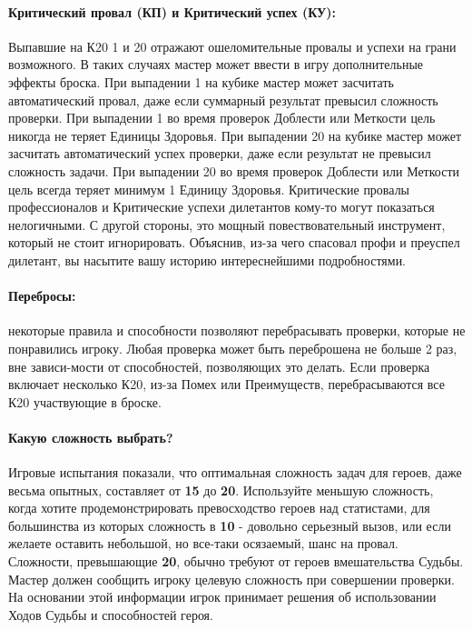 \paragraph{Критический провал (КП) и Критический успех (КУ):} 
Выпавшие на К20 1 и 20 отражают ошеломительные провалы и успехи на грани возможного. В таких случаях мастер может ввести в игру дополнительные эффекты броска. 
\newline При выпадении 1 на кубике мастер может засчитать автоматический провал, даже если суммарный результат превысил сложность проверки. При выпадении 1 во время проверок Доблести или Меткости цель никогда не теряет Единицы Здоровья.
\newline При выпадении 20 на кубике мастер может засчитать автоматический успех проверки, даже если результат не превысил сложность задачи. При выпадении 20 во время проверок Доблести или Меткости цель всегда теряет минимум 1 Единицу Здоровья.
\newline Критические провалы профессионалов и Критические успехи дилетантов кому-то могут показаться нелогичными. С другой стороны, это мощный повествовательный инструмент, который не стоит игнорировать. Объяснив, из-за чего спасовал профи и преуспел дилетант, вы насытите вашу историю интереснейшими подробностями.

\paragraph{Перебросы:} некоторые правила и способности позволяют перебрасывать проверки, которые не понравились игроку. Любая проверка может быть переброшена не больше 2 раз, вне зависи-мости от способностей, позволяющих это делать. Если проверка включает несколько К20, из-за Помех или Преимуществ, перебрасываются все К20 участвующие в броске.

\paragraph{Какую сложность выбрать?} Игровые испытания показали, что оптимальная сложность задач для героев, даже весьма опытных, составляет от \textbf{15} до \textbf{20}. Используйте меньшую сложность, когда хотите продемонстрировать превосходство героев над статистами, для большинства из которых сложность в \textbf{10} - довольно серьезный вызов, или если желаете оставить небольшой, но все-таки осязаемый, шанс на провал. Сложности, превышающие \textbf{20}, обычно требуют от героев вмешательства Судьбы.
\newline Мастер должен сообщить игроку целевую сложность при совершении проверки. На основании этой информации игрок принимает решения об использовании Ходов Судьбы и способностей героя.

